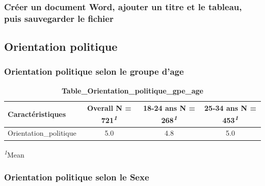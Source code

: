 \documentclass[
]{article}
\begin{document}
\hypertarget{cruxe9er-un-document-word-ajouter-un-titre-et-le-tableau-puis-sauvegarder-le-fichier}{%
\subsubsection{Créer un document Word, ajouter un titre et le tableau,
puis sauvegarder le
fichier}\label{cruxe9er-un-document-word-ajouter-un-titre-et-le-tableau-puis-sauvegarder-le-fichier}}

\newpage

\vspace{2cm}

\hypertarget{orientation-politique}{%
\subsection{Orientation politique}\label{orientation-politique}}

\vspace{2cm}

\hypertarget{orientation-politique-selon-le-groupe-dage}{%
\subsubsection{Orientation politique selon le groupe
d'age}\label{orientation-politique-selon-le-groupe-dage}}

\newpage
\begin{table}[!t]
\caption{\label{tab:unnamed-chunk-22}\textbf{Table\_Orientation\_politique\_gpe\_age}} 
\fontsize{12.0pt}{14.4pt}\selectfont
\begin{tabular*}{\linewidth}{@{\extracolsep{\fill}}lccc}
\toprule
\textbf{Caractéristiques} & \textbf{Overall}  N = 721\textsuperscript{\textit{1}} & \textbf{18-24 ans}  N = 268\textsuperscript{\textit{1}} & \textbf{25-34 ans}  N = 453\textsuperscript{\textit{1}} \\ 
\midrule\addlinespace[2.5pt]
Orientation\_politique & 5.0 & 4.8 & 5.0 \\ 
\bottomrule
\end{tabular*}
\begin{minipage}{\linewidth}
\textsuperscript{\textit{1}}Mean\\
\end{minipage}
\end{table}

\vspace{2cm}

\hypertarget{orientation-politique-selon-le-sexe}{%
\subsubsection{Orientation politique selon le
Sexe}\label{orientation-politique-selon-le-sexe}}
\end{document}
